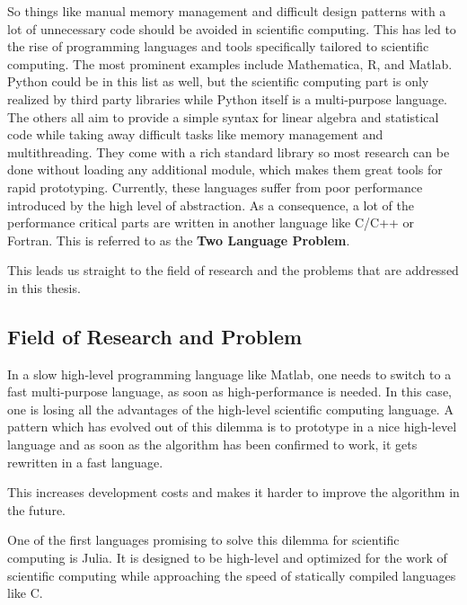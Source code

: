 So things like manual memory management and difficult design patterns with a lot of unnecessary code should be avoided in scientific computing.
This has led to the rise of programming languages and tools specifically tailored to scientific computing.
The most prominent examples include Mathematica, R, and Matlab. 
Python could be in this list as well, but the scientific computing part is only realized by third party libraries while Python itself is a multi-purpose language.
The others all aim to provide a simple syntax for linear algebra and statistical code while taking away difficult tasks like memory management and multithreading. 
They come with a rich standard library so most research can be done without loading any additional module, which makes them great tools for rapid prototyping.
Currently, these languages suffer from poor performance introduced by the high level of abstraction.
As a consequence, a lot of the performance critical parts are written in another language like C/C++ or Fortran.
This is referred to as the \textbf{Two Language Problem}\cite{ArrayMultiJeff}.

This leads us straight to the field of research and the problems that are addressed in this thesis.


\subsection{Field of Research and Problem}

In a slow high-level programming language like Matlab, one needs to switch to a fast multi-purpose language, as soon as high-performance is needed.
In this case, one is losing all the advantages of the high-level scientific computing language.
A pattern which has evolved out of this dilemma is to prototype in a nice high-level language and as soon as the algorithm has been confirmed to work, it gets rewritten in a fast language.

This increases development costs and makes it harder to improve the algorithm in the future.

One of the first languages promising to solve this dilemma for scientific computing is Julia\cite{DBLP:journals/corr/BezansonEKS14}. 
It is designed to be high-level and optimized for the work of scientific computing while approaching the speed of statically compiled languages like C.

